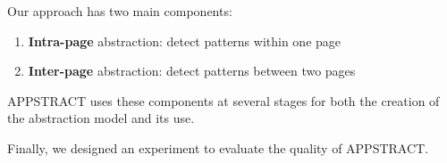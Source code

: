 Our approach has two main components:
\begin{enumerate}
    \item \textbf{Intra-page} abstraction: detect patterns within one page
    \item \textbf{Inter-page} abstraction: detect patterns between two pages 
\end{enumerate}
APPSTRACT uses these components at several stages for both the creation of the abstraction model and its use. 

Finally, we designed an experiment to evaluate the quality of APPSTRACT. 

